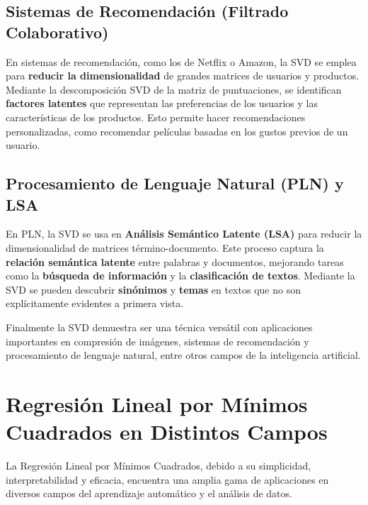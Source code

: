 \documentclass[12pt]{article}
\begin{document}
        \subsection*{Sistemas de Recomendación (Filtrado Colaborativo)}
        \noindent
        En sistemas de recomendación, como los de Netflix o Amazon, la SVD se emplea para \textbf{reducir la dimensionalidad} de grandes matrices de usuarios y productos. Mediante la descomposición SVD de la matriz de puntuaciones, se identifican \textbf{factores latentes} que representan las preferencias de los usuarios y las características de los productos. Esto permite hacer recomendaciones personalizadas, como recomendar películas basadas en los gustos previos de un usuario.
        
        \subsection*{Procesamiento de Lenguaje Natural (PLN) y LSA}
        \noindent
        En PLN, la SVD se usa en \textbf{Análisis Semántico Latente (LSA)} para reducir la dimensionalidad de matrices término-documento. Este proceso captura la \textbf{relación semántica latente} entre palabras y documentos, mejorando tareas como la \textbf{búsqueda de información} y la \textbf{clasificación de textos}. Mediante la SVD se pueden descubrir \textbf{sinónimos} y \textbf{temas} en textos que no son explícitamente evidentes a primera vista.

        \noindent
        Finalmente la SVD demuestra ser una técnica versátil con aplicaciones importantes en compresión de imágenes, sistemas de recomendación y procesamiento de lenguaje natural, entre otros campos de la inteligencia artificial.
        
        \section*{Regresión Lineal por Mínimos Cuadrados en Distintos Campos}
        \noindent
        La Regresión Lineal por Mínimos Cuadrados, debido a su simplicidad, interpretabilidad y eficacia, encuentra una amplia gama de aplicaciones en diversos campos del aprendizaje automático y el análisis de datos.
        
\end{document}
